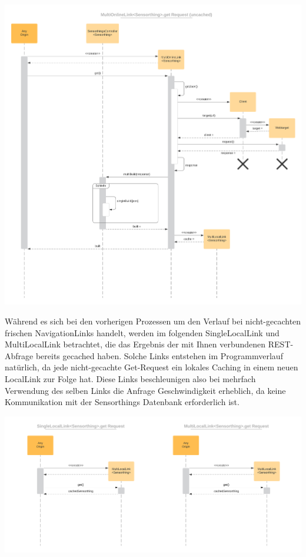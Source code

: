 \begin{center}
\includegraphics[scale=0.12]{media/backend/processes/MultiOnline.png}
\end{center}
Während es sich bei den vorherigen Prozessen um den Verlauf bei nicht-gecachten frischen NavigationLinks handelt, werden im folgenden SingleLocalLink und MultiLocalLink betrachtet,
die das Ergebnis der mit Ihnen verbundenen REST-Abfrage bereits gecached haben. Solche Links entstehen im Programmverlauf natürlich, da jede nicht-gecachte Get-Request ein lokales Caching in einem neuen LocalLink zur Folge hat.
Diese Links beschleunigen also bei mehrfach Verwendung des selben Links die Anfrage Geschwindigkeit erheblich, da keine Kommunikation mit der Sensorthings Datenbank erforderlich ist.
\begin{center}
\includegraphics[scale=0.12]{media/backend/processes/SingleAndMultiLocal.png}
\end{center}
